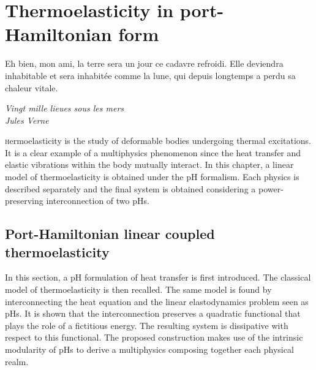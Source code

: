 \chapter{Thermoelasticity in port-Hamiltonian form}

\epigraph{Eh bien, mon ami, la terre sera un jour ce cadavre refroidi. Elle deviendra inhabitable et sera inhabitée comme la lune, qui depuis longtemps a perdu sa chaleur vitale.}{\textit{Vingt mille lieues sous les mers\\
Jules Verne}}
\minitoc
 
\lettrine{\color{theme}{T}}hermoelasticity is the study of deformable bodies undergoing thermal excitations. It is a clear example of a multiphysics phenomenon since the heat transfer and elastic vibrations within the body mutually interact. In this chapter, a linear model of thermoelasticity is obtained under the pH formalism. Each physics is described separately and the final system is obtained considering a power-preserving interconnection of two pHs.

\begin{comment}
The first work on this discipline dates back to \cite{duhamel1837}, but it was only more than a century later, thanks to the paper of Biot \cite{biot1956thermoelasticity}, that research on this topic received a new impulse.
\end{comment}

\section{Port-Hamiltonian linear coupled thermoelasticity}\label{sec:phTher}
In this section, a pH formulation of heat transfer is first introduced. The classical model of thermoelasticity is then recalled. The same model is found by interconnecting the heat equation and the linear elastodynamics problem seen as pHs. It is shown that the interconnection preserves a quadratic functional that plays the role of a fictitious energy. The resulting system is dissipative  with respect to this functional. The proposed construction makes use of the intrinsic modularity of pHs \cite{kurula2010} to derive a multiphysics composing together each physical realm.

